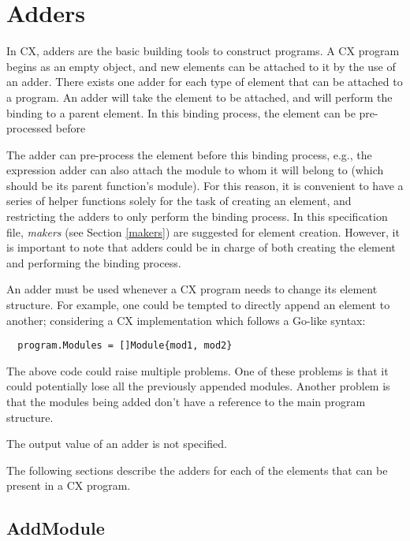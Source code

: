 
\chapter{Adders}
\label{adders}

In CX, adders are the basic building tools to construct programs. A CX
program begins as an empty object, and new elements can be attached to
it by the use of an adder. There exists one adder for each type of
element that can be attached to a program. An adder will take the
element to be attached, and will perform the binding to a parent element. In this binding
process, the element can be pre-processed before

The adder can pre-process the element before this binding process,
e.g., the expression adder can also attach the module to whom it will
belong to (which should be its parent function's module). For this
reason, it is convenient to have a series of helper functions solely
for the task of creating an element, and restricting the adders to
only perform the binding process. In this specification file,
\textit{makers} (see Section \ref{makers}) are suggested for element
creation. However, it is important to note that adders could be in
charge of both creating the element and performing the binding
process.

An adder must be used whenever a CX program needs to change its
element structure. For example, one could be tempted to directly
append an element to another; considering a CX implementation which
follows a Go-like syntax:

\begin{lstlisting}
  program.Modules = []Module{mod1, mod2}
\end{lstlisting}

The above code could raise multiple problems. One of these problems is
that it could potentially lose all the previously appended
modules. Another problem is that the modules being added don't have a
reference to the main program structure.

The output value of an adder is not specified.

The following sections describe the adders for each of the elements
that can be present in a CX program.

\section{AddModule}
\label{addmodule}

